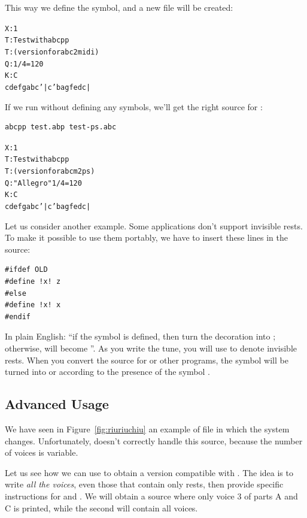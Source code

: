\documentclass[a4paper,12pt]{book}
\begin{document}
This way we define the  symbol, and a new \ABC{} file
will be created:

\begin{alltt}
X: 1
T: Test with abcpp
T: (version for abc2midi)
Q: 1/4 = 120
K: C
cdef gabc'|c'bag fedc|
\end{alltt}

If we run \abcpp{} without defining any symbols, we'll get the right
source for \abcm:

\begin{verbatim}
abcpp test.abp test-ps.abc
\end{verbatim}

\begin{alltt}
X: 1
T: Test with abcpp
T: (version for abcm2ps)
Q: "Allegro" 1/4 = 120
K: C
cdef gabc'|c'bag fedc|
\end{alltt}

Let us consider another example. Some \ABC{} applications don't
support invisible rests. To make it possible to use them portably, we
have to insert these lines in the source:

\begin{verbatim}
#ifdef OLD
#define !x! z
#else
#define !x! x
#endif
\end{verbatim}

In plain English: ``if the  symbol is defined, then turn the
 decoration into ; otherwise,  will become
''. As you write the tune, you will use  to denote
invisible rests. When you convert the source for \abcm{} or other
programs, the  symbol will be turned into  or 
according to the presence of the symbol .


\subsection{Advanced Usage}


We have seen in Figure~\ref{fig:riuriuchiu} an example of \ABC{} file
in which the system changes. Unfortunately, \abcmid{} doesn't
correctly handle this source, because the number of voices is
variable.

Let us see how we can use \abcpp{} to obtain a version compatible with
\abcmid. The idea is to write \emph{all the voices}, even those that
contain only rests, then provide specific instructions for \abcm{} and
\abcmid. We will obtain a source where only voice 3 of parts A and C
is printed, while the second will contain all voices.
\end{document}
